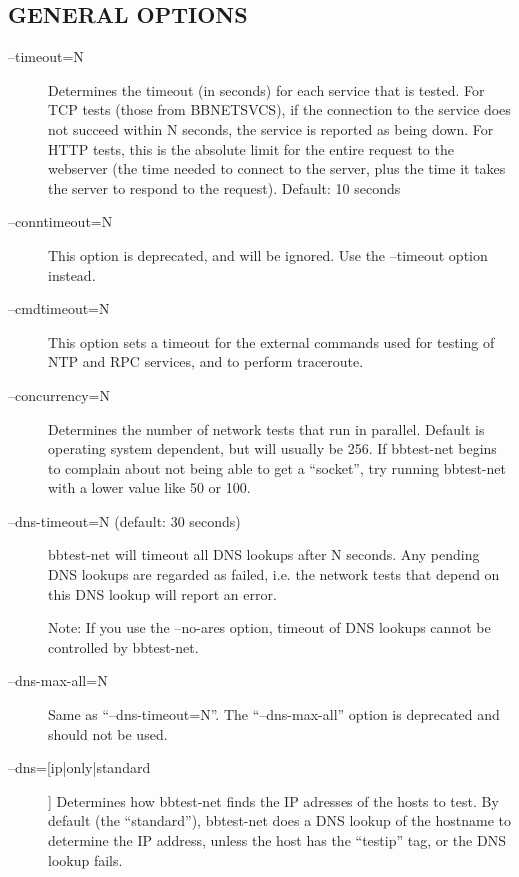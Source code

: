  
\subsection{GENERAL OPTIONS}


\begin{description}

\item[--timeout=N] Determines the timeout (in seconds) for each
  service that is tested. For TCP tests (those from BBNETSVCS), if the
  connection to the service does not succeed within N seconds, the
  service is reported as being down. For HTTP tests, this is the
  absolute limit for the entire request to the webserver (the time
  needed to connect to the server, plus the time it takes the server
  to respond to the request). Default: 10 seconds 



 

\item[--conntimeout=N] This option is deprecated, and will be
  ignored. Use the --timeout option instead. 


 

\item[--cmdtimeout=N] This option sets a timeout for the external
  commands used for testing of NTP and RPC services, and to perform
  traceroute. 


 

\item[--concurrency=N] Determines the number of network tests that run
  in parallel. Default is operating system dependent, but will usually
  be 256. If bbtest-net begins to complain about not being able to get
  a ``socket'', try running bbtest-net with a lower value like 50 or
  100. 


 

\item[--dns-timeout=N (default: 30 seconds)] bbtest-net will timeout
  all DNS lookups after N seconds. Any pending DNS lookups are
  regarded as failed, i.e. the network tests that depend on this DNS
  lookup will report an error.  

 Note: If you use the --no-ares option, timeout of DNS lookups cannot
 be controlled by bbtest-net. 


\item[--dns-max-all=N] Same as ``--dns-timeout=N''. The
  ``--dns-max-all'' option is deprecated and should not be used. 
 

\item[--dns=[ip|only|standard]] Determines how bbtest-net finds the IP
  adresses of the hosts to test. By default (the ``standard''),
  bbtest-net does a DNS lookup of the hostname to determine the IP
  address, unless the host has the ``testip'' tag, or the DNS lookup
  fails.  


\end{description}
